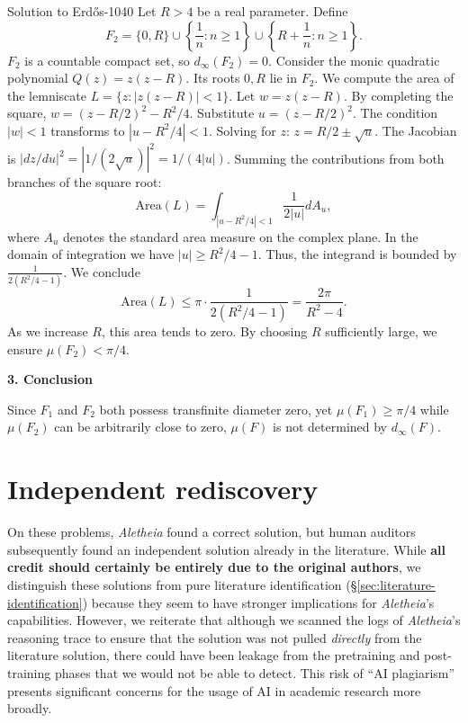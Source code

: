\documentclass{article}
\theoremstyle{plain}
\theoremstyle{definition}
\newcommand{\Aletheia}{\emph{Aletheia}}
\begin{document}
\begin{solution}{Solution to Erdős-1040}
Let $R > 4$ be a real parameter. Define
\[ F_2 = \{0, R\} \cup \left\{ \frac{1}{n} : n \ge 1 \right\} \cup \left\{ R + \frac{1}{n} : n \ge 1 \right\}. \]
$F_2$ is a countable compact set, so $d_\infty(F_2) = 0$.
Consider the monic quadratic polynomial $Q(z) = z(z-R)$. Its roots $0, R$ lie in $F_2$.
We compute the area of the lemniscate $L = \{z : |z(z-R)| < 1\}$.
Let $w = z(z-R)$. By completing the square, $w = (z - R/2)^2 - R^2/4$.
Substitute $u = (z - R/2)^2$. The condition $|w| < 1$ transforms to $|u - R^2/4| < 1$.
Solving for $z$: $z = R/2 \pm \sqrt{u}$.
The Jacobian is $|dz/du|^2 = |1/(2\sqrt{u})|^2 = 1/(4|u|)$.
Summing the contributions from both branches of the square root:
\[ \text{Area}(L) = \int_{|u - R^2/4| < 1} \frac{1}{2|u|} dA_u, \]
where $A_u$ denotes the standard area measure on the complex plane.
In the domain of integration we have $|u| \ge R^2/4 - 1$. Thus, the integrand is bounded by $\frac{1}{2(R^2/4 - 1)}$. 
We conclude
\[ \text{Area}(L) \le \pi \cdot \frac{1}{2(R^2/4 - 1)} = \frac{2\pi}{R^2 - 4}. \]
As we increase $R$, this area tends to zero. By choosing $R$ sufficiently large, we ensure $\mu(F_2) < \pi/4$.

\medskip
\textbf{3. Conclusion}

Since $F_1$ and $F_2$ both possess transfinite diameter zero, yet $\mu(F_1) \ge \pi/4$ while $\mu(F_2)$ can be arbitrarily close to zero, $\mu(F)$ is not determined by $d_\infty(F)$.
\end{solution}









\section{Independent rediscovery} On these problems, {\Aletheia} found a correct solution, but human auditors subsequently found an independent solution already in the literature. While \textbf{all credit should certainly be entirely due to the original authors}, we distinguish these solutions from pure literature identification (\S \ref{sec:literature-identification}) because they seem to have stronger implications for {\Aletheia}'s capabilities. However, we reiterate that although we scanned the logs of \Aletheia's reasoning trace to ensure that the solution was not pulled \emph{directly} from the literature solution, there could have been leakage from the pretraining and post-training phases that we would not be able to detect. This risk of ``AI plagiarism'' presents significant concerns for the usage of AI in academic research more broadly.
\end{document}
